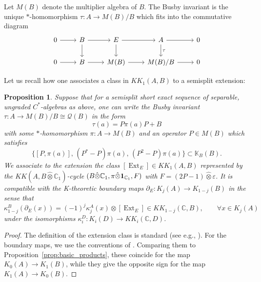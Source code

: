 \documentclass[12pt]{amsart}
\newtheorem{proposition}[theorem]{Proposition}
\newcommand{\CM}{{\mathbb C}}
\newcommand{\KM}{{\mathbb K}}
\newcommand{\Qq}{{\mathcal Q}}
\newcommand{\one}{{\bf 1}}
\newcommand{\ep}{\varepsilon}
\newcommand{\pdv}{\partial}
\DeclareMathOperator*{\Ext}{Ext}
\begin{document}
Let $M(B)$ denote the multiplier algebra of $B$. The Busby invariant is the unique $*$-homomorphism $\tau: A\to M(B)/B$ which fits into the commutative diagram
\begin{equation*}
	\begin{tikzcd}
		0 \arrow[r] & B \arrow[r] \arrow[d] & E \arrow[r] \arrow[d] & A \arrow[d, "\tau"]  \arrow[r] & 0 \\
		 0 \arrow[r]  & B \arrow[r] &  M(B) \arrow[r] & M(B)/B \arrow[r] & 0
	\end{tikzcd}
\end{equation*}

Let us recall how one associates a class in $KK_1(A,B)$ to a semisplit extension:

\begin{proposition}\label{prop:check_extension}
Suppose that for a semisplit short exact sequence of separable, ungraded $C^*$-algebras as above, one can write the Busby invariant $\tau: A \to M(B)/B \cong \Qq(B)$ in the form
$$\tau(a)= P \pi(a) P + B$$
with some $\ast$-homomorphism $\pi: A \to M(B)$ and an operator $P\in M(B)$ which satisfies 
\begin{equation*} 
\{[P,\pi(a)],\, (P^*-P)\pi(a),\, (P^2-P)\pi(a)\} \subset \KM_B(B).
\end{equation*}
We associate to the extension the class $[{\Ext}_E]\in KK_1(A,B)$ represented by the $KK(A, B\hat{\otimes}\CM_1)$-cycle $(B\hat{\otimes}\CM_1, \pi \hat{\otimes} \one_{\CM_1}, F)$  with $F=(2P-1)\hat{\otimes}\ep$. It is compatible with the K-theoretic boundary maps $\pdv_E:K_j(A)\to K_{1-j}(B)$ in the sense that 
\begin{equation}
\label{eq:bulk_edge_kk}
\kappa_{1-j}^B(\pdv_{E}(x)) = (-1)^{j}\kappa^A_j(x) \otimes [{\Ext}_{E}] \in KK_{1-j}(\CM, B), \qquad \forall x\in K_j(A)
\end{equation}
under the isomorphisms $\kappa_i^D: K_i(D)\to KK_i(\CM, D)$.

\end{proposition}
\begin{proof}
The definition of the extension class is standard (see e.g., \cite[17.6.4]{blackadar1998k}). For the boundary maps, we use the conventions of \cite{RordamLarsenLaustsen2000}.
Comparing them to Proposition~\ref{prop:basic_products}, these coincide for the map $K_0(A)\to K_1(B)$, while they give the opposite sign for the map $K_1(A)\to K_0(B)$. 
\end{proof}
\end{document}
